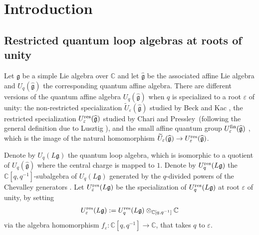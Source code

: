 \documentclass[12pt, reqno]{amsart}
\numberwithin{equation}{section}
\newcommand{\fin}{{\rm fin}}
\newcommand{\res}{{\rm res}}
\begin{document}
\maketitle

\setcounter{tocdepth}{1}
\tableofcontents
\vspace{-1cm}



\section{Introduction}
\subsection{Restricted quantum loop algebras at roots of unity} Let $\mathfrak{g}$ be a simple Lie algebra over $\mathbb{C}$ and let $\mathfrak{\widehat{g}}$ be the associated affine Lie algebra and $U_q(\widehat{\mathfrak{g}})$ the corresponding quantum affine algebra. There are different versions of the quantum affine algebra $U_q(\widehat{\mathfrak{g}})$ when $q$ is specialized to a root $\varepsilon$ of unity: the non-restricted specialization $\widetilde{U}_{\varepsilon}(\widehat{\mathfrak{g}})$ studied by Beck and Kac \cite{BK96}, the restricted specialization $U_{\varepsilon}^{\res}(\widehat{\mathfrak{g}})$ studied by Chari and Pressley \cite{CP94}\,(following the general definition due to Lusztig \cite{L93}), and the small affine quantum group $U_{\varepsilon}^{\fin}(\widehat{\mathfrak{g}})$ \cite{CP94}, which is the image of the natural homomorphism $\widetilde{U}_{\varepsilon}(\widehat{\mathfrak{g}}) \rightarrow U_{\varepsilon}^{\res}(\widehat{\mathfrak{g}})$.

Denote by $U_q(L \mathfrak{g})$ the quantum loop algebra, which is isomorphic to a quotient of $U_q(\widehat{\mathfrak{g}})$ where the central charge is mapped to $1$. Denote by $U_q^{\res}({L\mathfrak{g}})$ the $\mathbb{C}[q,q^{-1}]$-subalgebra of $U_q(L\mathfrak{g})$ generated by the $q$-divided powers of the Chevalley generators {\cite[Section 1]{CP97b}}. Let $U_\varepsilon^{\res}({L\mathfrak{g}})$ be the specialization of $U_q^{\res}({L\mathfrak{g}})$ at root $\varepsilon$ of unity, by setting
\begin{align*}
U_\varepsilon^{\res}({L\mathfrak{g}}):=U_q^{\res}({L\mathfrak{g}}) \otimes_{\mathbb{C}[q, q^{-1}]}\mathbb{C}
\end{align*}
via the algebra homomorphism $f_{\varepsilon}: \mathbb{C}[q, q^{-1}]\rightarrow \mathbb{C}$, that takes $q$ to $\varepsilon$.
\end{document}
